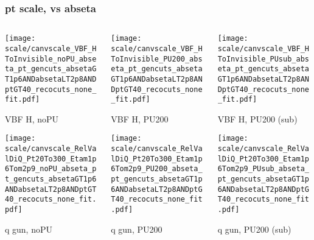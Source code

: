\documentclass[8pt]{beamer}
\begin{document}
  \begin{frame}
  \frametitle{pt scale, vs abseta}
  
  \begin{columns}
   \begin{column}{0.35\textwidth}
     \texttt{[image: scale/canvscale\_VBF\_HToInvisible\_noPU\_abseta\_pt\_gencuts\_absetaGT1p6ANDabsetaLT2p8ANDptGT40\_recocuts\_none\_fit.pdf]}
     
     VBF H, noPU
    
     \texttt{[image: scale/canvscale\_RelValDiQ\_Pt20To300\_Etam1p6Tom2p9\_noPU\_abseta\_pt\_gencuts\_absetaGT1p6ANDabsetaLT2p8ANDptGT40\_recocuts\_none\_fit.pdf]}
     
     q gun, noPU
   \end{column}
   \begin{column}{0.35\textwidth}
     \texttt{[image: scale/canvscale\_VBF\_HToInvisible\_PU200\_abseta\_pt\_gencuts\_absetaGT1p6ANDabsetaLT2p8ANDptGT40\_recocuts\_none\_fit.pdf]}
     
     VBF H, PU200
    
     \texttt{[image: scale/canvscale\_RelValDiQ\_Pt20To300\_Etam1p6Tom2p9\_PU200\_abseta\_pt\_gencuts\_absetaGT1p6ANDabsetaLT2p8ANDptGT40\_recocuts\_none\_fit.pdf]}
     
     q gun, PU200
   \end{column}
   \begin{column}{0.35\textwidth}
     \texttt{[image: scale/canvscale\_VBF\_HToInvisible\_PUsub\_abseta\_pt\_gencuts\_absetaGT1p6ANDabsetaLT2p8ANDptGT40\_recocuts\_none\_fit.pdf]}
     
     VBF H, PU200 (sub)
    
     \texttt{[image: scale/canvscale\_RelValDiQ\_Pt20To300\_Etam1p6Tom2p9\_PUsub\_abseta\_pt\_gencuts\_absetaGT1p6ANDabsetaLT2p8ANDptGT40\_recocuts\_none\_fit.pdf]}
     
     q gun, PU200 (sub)
   \end{column}
  \end{columns}
 \end{frame}
 
\end{document}

